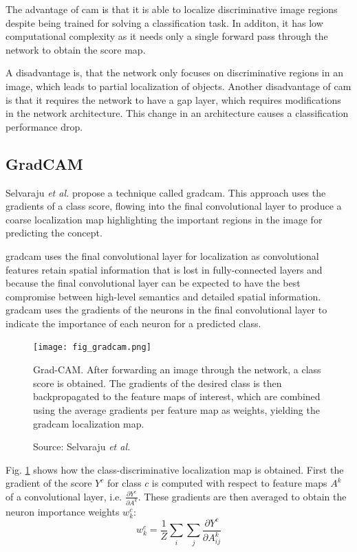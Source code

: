 The advantage of \acrlong{cam} is that it is able to localize discriminative image regions despite being trained for solving a classification task. In additon, it has low computational complexity as it needs only a single forward pass through the network to obtain the score map.

A disadvantage is, that the network only focuses on discriminative regions in an image, which leads to partial localization of objects. Another disadvantage of \acrshort{cam} is that it requires the network to have a \acrshort{gap} layer, which requires modifications in the network architecture. This change in an architecture causes a classification performance drop.

\subsection{GradCAM}
Selvaraju \textit{et al.} \cite{selvaraju2017grad} propose a technique called \acrfull{gradcam}. This approach uses the gradients of a class score, flowing into 
the final convolutional layer to produce a coarse localization map highlighting the important regions in the image for predicting the concept. 

\acrshort{gradcam} uses the final convolutional layer for localization as convolutional features retain spatial information that is lost in fully-connected layers and because the final convolutional layer can be expected to have the best compromise between high-level semantics and detailed spatial information. \acrshort{gradcam} uses the gradients of the neurons in the final convolutional layer to indicate the importance of each neuron for a predicted class.

\begin{figure}[ht]
    \begin{center}       
    \texttt{[image: fig\_gradcam.png]}
    \caption[Grad-CAM]{Grad-CAM. After forwarding an image through the network, a class score is obtained. The gradients of the desired class is then backpropagated to the feature maps of interest, which are combined using the average gradients per feature map as weights, yielding the \acrshort{gradcam} localization map.}
    \caption*{Source: Selvaraju \textit{et al.} \cite{selvaraju2017grad}}
    \label{fig:gradcam}
    \end{center}
\end{figure}
Fig. \ref{fig:gradcam} shows how the class-discriminative localization map is obtained. First the gradient of the score $Y^c$ for class $c$ is computed with respect to feature maps $A^k$ of a convolutional layer, i.e. $\frac{\partial{Y^c}}{\partial{A^k}}$. These gradients are then averaged to obtain the neuron importance weights $w_{k}^{c}$:
\begin{equation}
    w_{k}^{c} = \frac{1}{Z}\sum_{i}\sum_{j}\frac{\partial{Y^c}}{\partial{A_{ij}^{k}}}
\end{equation}

